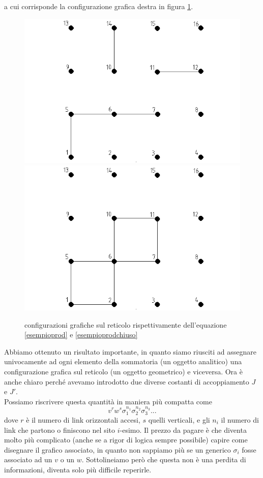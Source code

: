 \documentclass[11pt]{article}
\begin{document}
a cui corrisponde la configurazione grafica destra in figura \ref{confgraf}.
\begin{figure}
\centering
\includegraphics[width=0.47\columnwidth]{sat21}\quad\includegraphics[width=0.47\columnwidth]{sat22}
\caption{configurazioni grafiche sul reticolo rispettivamente dell'equazione \ref{esempioprod} e \ref{esempioprodchiuso} }
\label{confgraf}
\end{figure}

 Abbiamo ottenuto un risultato importante, in quanto siamo riusciti ad  assegnare univocamente ad ogni elemento della sommatoria (un oggetto analitico) una configurazione grafica sul reticolo (un oggetto geometrico) e viceversa.
 Ora è anche chiaro perché avevamo introdotto due diverse costanti di accoppiamento $J$ e $J'$.\\
 Possiamo riscrivere questa quantità in maniera più compatta come
\begin{equation}\label{geomcom}
v^rw^s\sigma_1^{n_1}\sigma_2^{n_2}\sigma_3^{n_3}...
\end{equation}
dove $r$ è il numero di link orizzontali accesi, $s$ quelli verticali, e gli $n_i$ il numero di link che partono o finiscono nel sito $i$-esimo. Il prezzo da pagare è che diventa molto più complicato (anche se a rigor di logica sempre possibile) capire come disegnare il grafico associato, in quanto non sappiamo più se un generico $\sigma_{i}$ fosse associato ad un $v$ o un $w$. Sottolineiamo però che questa non è una perdita di informazioni, diventa solo più difficile reperirle.
\end{document}
